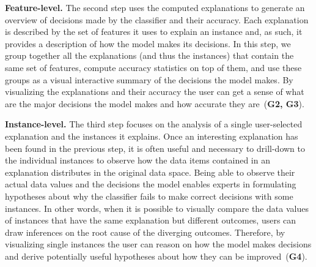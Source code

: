     
\par \noindent \textbf{Feature-level.} The second step uses the computed explanations to generate an overview of decisions made by the classifier and their accuracy. Each explanation is described by the set of features it uses to explain an instance and, as such, it provides a description of how the model makes its decisions. In this step, we group together all the explanations (and thus the instances) that contain the same set of features, compute accuracy statistics on top of them, and use these groups as a visual interactive summary of the decisions the model makes. By visualizing the explanations and their accuracy the user can get a sense of what are the major decisions the model makes and how accurate they are~(\textbf{G2, G3}).
    
    
\par \noindent \textbf{Instance-level.} The third step focuses on the analysis of a single user-selected explanation and the instances it explains. Once an interesting explanation has been found in the previous step, it is often useful and necessary to drill-down to the individual instances to observe how the data items contained in an explanation distributes in the original data space. Being able to observe their actual data values and the decisions the model enables experts in formulating hypotheses about why the classifier fails to make correct decisions with some instances. In other words, when it is possible to visually compare the data values of instances that have the same explanation but different outcomes, users can draw inferences on the root cause of the diverging outcomes. Therefore, by visualizing single instances the user can reason on how the model makes decisions and derive potentially useful hypotheses about how they can be improved~(\textbf{G4}). 
    
